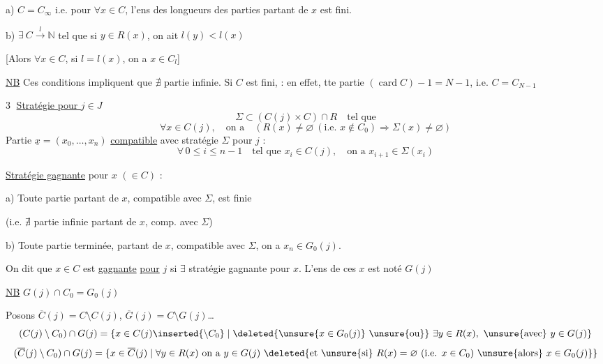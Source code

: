  a) $C=C_\infty$ i.e. pour $\forall x\in C$, l'ens des longueurs des parties partant de $x$ est fini.

 b) $\exists\ C\xrightarrow{l}\mathbb N$ tel que si $y\in R(x)$, on ait $l(y)<l(x)$

[Alors $\forall x\in C$, si $l=l(x)$, on a $x\in C_l$]


\uline{NB} Ces conditions impliquent que $\nexists$ partie infinie.
 Si $C$ est fini,  : en effet, tte partie   $(\operatorname{card}C)-1=N-1$, i.e. $C=C_{N-1}$


\textcircled{3} \uline{Stratégie pour $j\in J$}
\[
\Sigma\subset(C(j)\times C)\cap R\quad\text{tel que}
\]
\[
\forall x\in C(j),\quad\text{on a}\quad(R(x)\ne\varnothing\ (\text{i.e. }x\notin C_0)\Longrightarrow\Sigma(x)\ne\varnothing)
\]
Partie $\underline x=(x_0,\ldots,x_n)$ \uline{compatible} avec stratégie $\Sigma$ pour $j$ :
\[
\forall\,0\leq i\leq n-1\quad\text{tel que }x_i\in C(j),\quad\text{on a }x_{i+1}\in\Sigma(x_i)
\]

\uline{Stratégie gagnante}  pour $x$ $(\in C)$ :

 a) Toute partie partant de $x$, compatible avec $\Sigma$, est finie

(i.e. $\nexists$ partie infinie partant de $x$, comp. avec $\Sigma$)

 b)  Toute partie terminée, partant de $x$,  compatible avec $\Sigma$, on a $x_n\in G_0(j)$.

On dit que $x\in C$ est \uline{gagnante} \uline{pour} $j$ si $\exists$ stratégie  gagnante pour $x$.
L'ens de ces $x$ est noté $G(j)$

\uline{NB} $G(j)\cap C_0=G_0(j)$

Posons $\overline C(j)=C\setminus C(j)$, $\overline G(j)=C\setminus G(j)$\ldots
{}
\[
(C(j)\setminus C_0)\cap G(j)=\{x\in C(j)\inserted{\setminus C_0}\mid\deleted{\unsure{x\in G_0(j)}\ \unsure{\text{ou}}}\ \exists y\in R(x),\ \unsure{\text{avec}}\ y\in G(j)\}
\]
\[
(\overline C(j)\setminus C_0)\cap G(j)=\{x\in\overline C(j)\mid\forall y\in R(x)\ \text{on a }y\in G(j)\ \deleted{\text{et }\unsure{\text{si}}\ R(x)=\varnothing\ (\text{i.e. }x\in C_0)\ \unsure{\text{alors}}\ x\in G_0(j)}\}
\]

